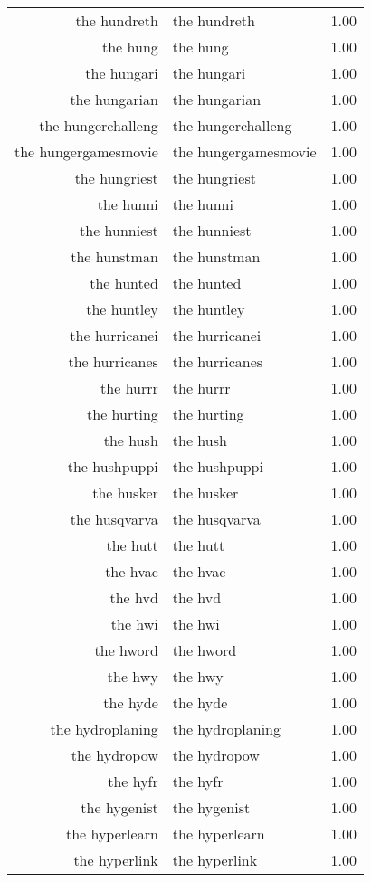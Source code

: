\begin{table}[ht]
\begin{tabular}{rlr}
  the hundreth & the hundreth & 1.00 \\ 
  the hung & the hung & 1.00 \\ 
  the hungari & the hungari & 1.00 \\ 
  the hungarian & the hungarian & 1.00 \\ 
  the hungerchalleng & the hungerchalleng & 1.00 \\ 
  the hungergamesmovie & the hungergamesmovie & 1.00 \\ 
  the hungriest & the hungriest & 1.00 \\ 
  the hunni & the hunni & 1.00 \\ 
  the hunniest & the hunniest & 1.00 \\ 
  the hunstman & the hunstman & 1.00 \\ 
  the hunted & the hunted & 1.00 \\ 
  the huntley & the huntley & 1.00 \\ 
  the hurricanei & the hurricanei & 1.00 \\ 
  the hurricanes & the hurricanes & 1.00 \\ 
  the hurrr & the hurrr & 1.00 \\ 
  the hurting & the hurting & 1.00 \\ 
  the hush & the hush & 1.00 \\ 
  the hushpuppi & the hushpuppi & 1.00 \\ 
  the husker & the husker & 1.00 \\ 
  the husqvarva & the husqvarva & 1.00 \\ 
  the hutt & the hutt & 1.00 \\ 
  the hvac & the hvac & 1.00 \\ 
  the hvd & the hvd & 1.00 \\ 
  the hwi & the hwi & 1.00 \\ 
  the hword & the hword & 1.00 \\ 
  the hwy & the hwy & 1.00 \\ 
  the hyde & the hyde & 1.00 \\ 
  the hydroplaning & the hydroplaning & 1.00 \\ 
  the hydropow & the hydropow & 1.00 \\ 
  the hyfr & the hyfr & 1.00 \\ 
  the hygenist & the hygenist & 1.00 \\ 
  the hyperlearn & the hyperlearn & 1.00 \\ 
  the hyperlink & the hyperlink & 1.00 \\ 

\end{tabular}
\end{table}
